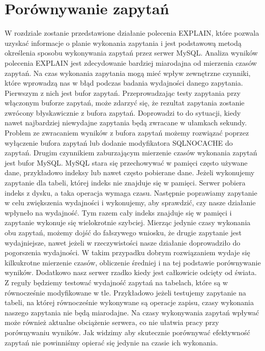 \section{Porównywanie zapytań}
W rozdziale zostanie przedstawione działanie polecenia EXPLAIN, które pozwala uzyskać informacje o planie wykonania zapytania i jest podstawową metodą określenia sposobu wykonywania zapytań przez serwer MySQL. Analiza wyników polecenia EXPLAIN jest zdecydowanie bardziej miarodajna od mierzenia czasów zapytań. Na czas wykonania zapytania mogą mieć wpływ zewnętrzne czynniki, które wprowadzą nas w błąd podczas badania wydajności danego zapytania. Pierwszym z nich jest bufor zapytań. Przeprowadzając testy zapytania przy włączonym buforze zapytań, może zdarzyć się, że rezultat zapytania zostanie zwrócony błyskawicznie z bufora zapytań. Doprowadzi to do sytuacji, kiedy nawet najbardziej niewydajne zapytania będą zwracane w ułamkach sekundy.  Problem ze zwracaniem wyników z bufora zapytań możemy rozwiązać poprzez wyłączenie bufora zapytań lub dodanie modyfikatora SQL\textunderscore NO\textunderscore CACHE do zapytań. Drugim czynnikiem zaburzającym mierzenie czasów wykonania zapytań jest bufor MySQL. MySQL stara się przechowywać w pamięci często używane dane, przykładowo indeksy lub nawet często pobierane dane. Jeżeli wykonujemy zapytanie dla tabeli, której indeks nie znajduje się w pamięci. Serwer pobiera indeks z dysku, a taka operacja wymaga czasu. Następnie poprawiamy zapytanie w celu zwiększenia wydajności i wykonujemy, aby sprawdzić, czy nasze działanie wpłyneło na wydajność. Tym razem cały indeks znajduje się w pamięci i zapytanie wykonuje się wielokrotnie szybciej. Mierząc jedynie czasy wykonania obu zapytań, możemy dojść do fałszywego wniosku, że drugie zapytanie jest wydajniejsze, nawet jeżeli w rzeczywistości nasze działanie doprowadziło do pogorszenia wydajności. W takim przypadku dobrym rozwiązaniem wydaje się kilkukrotne mierzenie czasów, obliczenie średniej i na tej podstawie porównywanie wyników. Dodatkowo nasz serwer rzadko kiedy jest całkowicie odcięty od świata. Z reguły będziemy testować wydajność zapytań na tabelach, które są w równocześnie modyfikowane w tle. Przykładowo jeżeli testujemy zapytanie na tabeli, na której równocześnie wykonywane są operacje zapisu, czasy wykonania naszego zapytania nie będą miarodajne. Na czasy wykonywania zapytań wpływać może również aktualne obciążenie serwera, co nie ułatwia pracy przy porównywaniu wyników. Jak widzimy aby skutecznie porównywać efektywność zapytań nie powinniśmy opierać się jedynie na czasie ich wykonania.
